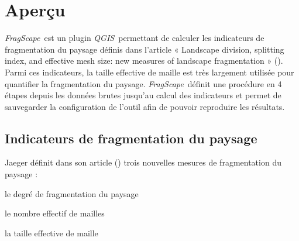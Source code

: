 \documentclass[11pt]{article}
\date{\today}
\newcommand{\mycite}[1]{ (\cite{#1})}
\newcommand{\tool}{\emph{FragScape}}
\newcommand{\qgis}{\emph{QGIS}}
\newcommand{\myfigureref}[1]{Figure \ref{#1} : \hyperref[#1]{\nameref{#1}}\dotfill\pageref{#1}}
\let\tempone\itemize
\let\temptwo\enditemize
\renewenvironment{itemize}{\tempone\addtolength{\itemsep}{-0.5\baselineskip}}{\temptwo}
\begin{document}
\renewcommand{\appendixtocname}{Annexes}
\renewcommand{\appendixpagename}{\color{color1}{Annexes}} 
\sloppy


\vspace{4cm}

\maketitle

\clearpage

\pagestyle{style1}

\setlength{\headsep}{0.9in}

\tableofcontents

\hspace{4cm}







\pagebreak

\section{Aperçu}

\tool\ est un plugin \qgis\ permettant de calculer les indicateurs de fragmentation du paysage définis dans l'article « Landscape division, splitting index, and effective mesh size: new measures of landscape fragmentation » \mycite{jaeger}.
Parmi ces indicateurs, la taille effective de maille est très largement utilisée pour quantifier la fragmentation du paysage. \tool\ définit une procédure en 4 étapes depuis les données brutes jusqu'au calcul des indicateurs et permet de sauvegarder la configuration de l'outil afin de pouvoir reproduire les résultats.

\subsection{Indicateurs de fragmentation du paysage}
\label{sec:metrics}

Jaeger définit dans son article\mycite{jaeger} trois nouvelles mesures de fragmentation du paysage :
\begin{itemize}
    \item le degré de fragmentation du paysage 
    \item le nombre effectif de mailles
    \item la taille effective de maille
\end{itemize}
\end{document}
